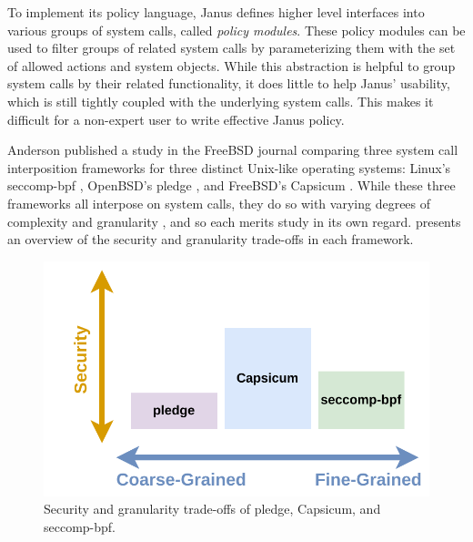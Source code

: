 \documentclass[dvipsnames, 12pt]{article}
\begin{document}
To implement its policy language, Janus defines higher level interfaces into
various groups of system calls, called \textit{policy modules}. These policy
modules can be used to filter groups of related system calls by parameterizing
them with the set of allowed actions and system objects. While this abstraction
is helpful to group system calls by their related functionality, it does little
to help Janus' usability, which is still tightly coupled with the underlying
system calls. This makes it difficult for a non-expert user to write effective
Janus policy.


Anderson published a study in the FreeBSD journal \cite{anderson2017_comparison}
comparing three system call interposition frameworks for three distinct
Unix-like operating systems: Linux's seccomp-bpf \cite{seccomp_bpf,
drewry2012_seccomp_bpf}, OpenBSD's pledge \cite{pledge}, and FreeBSD's Capsicum
\cite{capsicum, watson2010_capsicum}. While these three frameworks all interpose
on system calls, they do so with varying degrees of complexity and granularity
\cite{anderson2017_comparison}, and so each merits study in its own regard.
 presents an overview of the security
and granularity trade-offs in each framework.

\begin{figure}[htpb]
    \centering
    \includegraphics[width=0.8\linewidth]{figs/systemcall-interposition.pdf}
    \caption{Security and granularity trade-offs of pledge,
    Capsicum, and seccomp-bpf.}%
    \label{fig:syscall_interposition}
\end{figure}
\end{document}
